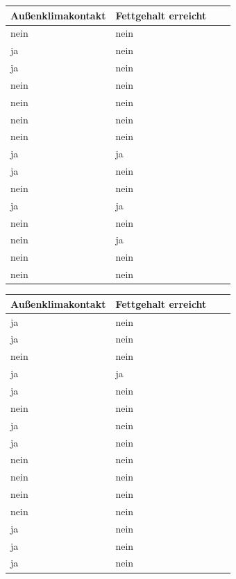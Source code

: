 \documentclass[a4paper, 9pt]{scrartcl}\usepackage[]{graphicx}\usepackage[]{xcolor}
\begin{document}
\begin{center}
\begin{minipage}[t]{0.45\textwidth}
\begin{center}

\begin{tabular}{p{2.5cm}p{2.5cm}p{2.5cm}p{2.5cm}}
\toprule
Außenklimakontakt & Fettgehalt erreicht\\
\midrule
nein & nein\\
ja & nein\\
ja & nein\\
nein & nein\\
nein & nein\\
\addlinespace
nein & nein\\
nein & nein\\
ja & ja\\
ja & nein\\
nein & nein\\
\addlinespace
ja & ja\\
nein & nein\\
nein & ja\\
nein & nein\\
nein & nein\\
\bottomrule
\end{tabular}


\end{center}
\end{minipage}
\begin{minipage}[t]{0.45\textwidth}
\begin{center}

\begin{tabular}{p{2.5cm}p{2.5cm}p{2.5cm}p{2.5cm}}
\toprule
Außenklimakontakt & Fettgehalt erreicht\\
\midrule
ja & nein\\
ja & nein\\
nein & nein\\
ja & ja\\
ja & nein\\
\addlinespace
nein & nein\\
ja & nein\\
ja & nein\\
nein & nein\\
nein & nein\\
\addlinespace
nein & nein\\
nein & nein\\
ja & nein\\
ja & nein\\
ja & nein\\
\bottomrule
\end{tabular}


\end{center}
\end{minipage}
\end{center}
\end{document}
